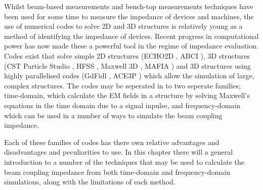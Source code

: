 Whilst beam-based measurements and bench-top measurements techniques have been used for some time to measure the impedance of devices and machines, the use of numerical codes to solve 2D and 3D structures is relatively young as a method of identifying the impedance of devices. Recent progress in computational power has now made these a powerful tool in the regime of impedance evaluation. Codes exist that solve simple 2D structures (ECHO2D \cite{Weiland:Echo2d}, ABCI \cite{Chin:ABCI}), 3D structures (CST Particle Studio \cite{cst}, HFSS \cite{hfss}, Maxwell 3D \cite{maxwell}, MAFIA \cite{Weiland:MAFIAv4}) and 3D structures using highly parallelised codes (GdFidl \cite{gdfidl}, ACE3P \cite{Ng:Ace3p}) which allow the simulation of large, complex structures. The codes may be seperated in to two seperate families; time-domain, which calculate the EM fields in a structure by solving Maxwell's equations in the time domain due to a signal inpulse, and frequency-domain which can be used in a number of ways to simulate the beam coupling impedance.

Each of these families of codes has there own relative advantages and disadvantages and peculiarities to use. In this chapter there will a general introduction to a number of the techniques that may be used to calculate the beam coupling impedance from both time-domain and frequency-domain simulations, along with the limitations of each method.
